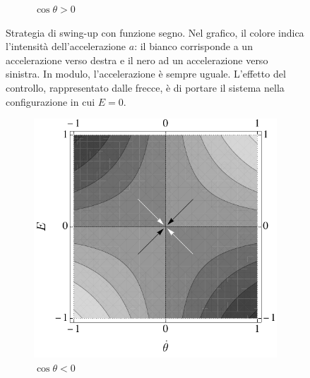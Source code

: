 \begin{figure}
\begin{subfigure}[t]{0.48\textwidth}
        \caption{$\cos\theta > 0$}
    \end{subfigure}
    \caption[Swing-up con funzione segno]{Strategia di swing-up con funzione segno.
    Nel grafico, il colore indica l'intensità dell'accelerazione $a$: il bianco
    corrisponde a un accelerazione verso destra e il nero ad un accelerazione verso sinistra.
    In modulo, l'accelerazione è sempre uguale. L'effetto del controllo, rappresentato dalle frecce, è
    di portare il sistema nella configurazione in cui $E = 0$.} %
    \label{fig:energy-control}
\end{figure}

\begin{figure}
    \centering
    \begin{subfigure}[b]{0.48\textwidth}
        \centering
        \includegraphics[width=\textwidth]{assets/energy-control3}
        \caption{$\cos\theta < 0$}
    \end{subfigure}
    \hfill
    \begin{subfigure}[b]{0.48\textwidth}
        \centering

\end{subfigure}
\end{figure}
